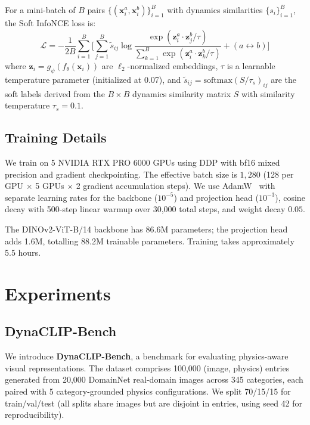 \documentclass{article}
\begin{document}
For a mini-batch of $B$ pairs $\{(\mathbf{x}_i^a, \mathbf{x}_i^b)\}_{i=1}^B$ with dynamics similarities $\{s_i\}_{i=1}^B$, the Soft InfoNCE loss is:
\begin{equation}
    \mathcal{L} = -\frac{1}{2B} \sum_{i=1}^{B} \bigg[
        \sum_{j=1}^{B} \tilde{s}_{ij} \log \frac{\exp(\mathbf{z}_i^a \cdot \mathbf{z}_j^b / \tau)}{\sum_{k=1}^{B} \exp(\mathbf{z}_i^a \cdot \mathbf{z}_k^b / \tau)}
        + (a \leftrightarrow b)
    \bigg]
    \label{eq:loss}
\end{equation}
where $\mathbf{z}_i = g_\psi(f_\theta(\mathbf{x}_i))$ are $\ell_2$-normalized embeddings, $\tau$ is a learnable temperature parameter (initialized at 0.07), and $\tilde{s}_{ij} = \text{softmax}(S / \tau_s)_{ij}$ are the soft labels derived from the $B \times B$ dynamics similarity matrix $S$ with similarity temperature $\tau_s = 0.1$.


\subsection{Training Details}
\label{sec:training}

We train on 5 NVIDIA RTX PRO 6000 GPUs using DDP with bf16 mixed precision and gradient checkpointing. The effective batch size is $1{,}280$ (128 per GPU $\times$ 5 GPUs $\times$ 2 gradient accumulation steps). We use AdamW~\cite{loshchilov2019adamw} with separate learning rates for the backbone ($10^{-5}$) and projection head ($10^{-3}$), cosine decay with 500-step linear warmup over 30{,}000 total steps, and weight decay $0.05$.

The DINOv2-ViT-B/14 backbone has 86.6M parameters; the projection head adds 1.6M, totalling 88.2M trainable parameters. Training takes approximately 5.5 hours.


\section{Experiments}
\label{sec:experiments}

\subsection{DynaCLIP-Bench}
\label{sec:bench}

We introduce \textbf{DynaCLIP-Bench}, a benchmark for evaluating physics-aware visual representations. The dataset comprises 100{,}000 (image, physics) entries generated from 20{,}000 DomainNet real-domain images across 345 categories, each paired with 5 category-grounded physics configurations. We split 70/15/15 for train/val/test (all splits share images but are disjoint in entries, using seed 42 for reproducibility).
\end{document}
